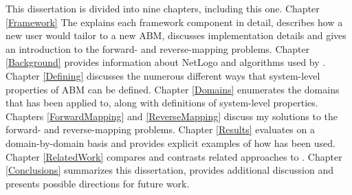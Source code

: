 This dissertation is divided into nine chapters, including this one.
Chapter \ref{Framework} The \framework explains each framework component in detail, describes how a new user would tailor \fw to a new ABM, discusses implementation details and gives an introduction to the forward- and reverse-mapping problems.
Chapter \ref{Background} provides information about NetLogo and algorithms used by \fw.
Chapter \ref{Defining} discusses the numerous different ways that system-level properties of ABM can be defined.
Chapter \ref{Domains} enumerates the domains that \fw has been applied to, along with definitions of system-level properties.
Chapters \ref{ForwardMapping} and \ref{ReverseMapping} discuss my solutions to the forward- and reverse-mapping problems.
Chapter \ref{Results} evaluates \fw on a domain-by-domain basis and provides explicit examples of how \fw has been used.
Chapter \ref{RelatedWork} compares and contrasts related approaches to \fw.
Chapter \ref{Conclusions} summarizes this dissertation, provides additional discussion and presents possible directions for future work.


 





